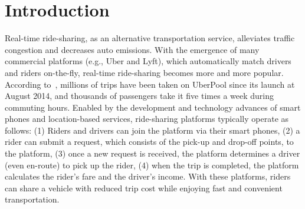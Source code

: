 \section{Introduction}
\label{sec:intro}
%	
%	
%	
%	
%	


Real-time ride-sharing, as an alternative transportation service, alleviates traffic congestion and decreases auto emissions. With the emergence of many commercial platforms (e.g., Uber and Lyft), which automatically match drivers and riders on-the-fly, real-time ride-sharing becomes more and more popular. According to~\cite{uberpool}, millions of trips have been taken on UberPool since its launch at August 2014, and thousands of passengers take it five times a week during commuting hours. Enabled by the development and technology advances of smart phones and location-based services, ride-sharing platforms typically operate as follows: (1) Riders and drivers can join the platform via their smart phones, (2) a rider can submit a request, which consists of the pick-up and drop-off points, to the platform, (3) once a new request is received, the platform determines a driver (even en-route) to pick up the rider, (4) when the trip is completed, the platform calculates the rider's fare and the driver's income. With these platforms, riders can share a vehicle with reduced trip cost while enjoying fast and convenient transportation.

